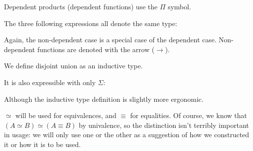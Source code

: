 \begin{definition}
  Dependent products (dependent functions) use the \(\Pi\) symbol.

  The three following expressions all denote the same type:

  \begin{multicols}{3}
    \begin{agdalisting}
    \end{agdalisting}

    \begin{agdalisting}
    \end{agdalisting}

    \begin{agdalisting}
    \end{agdalisting}
  \end{multicols}

  Again, the non-dependent case is a special case of the dependent case.
  Non-dependent functions are denoted with the arrow (\(\rightarrow\)).
\end{definition}

\begin{definition}
  We define disjoint union as an inductive type.

  \begin{agdalisting}
  \end{agdalisting}

  It is also expressible with only \(\Sigma\):

  \begin{agdalisting}
  \end{agdalisting}

  Although the inductive type definition is slightly more ergonomic.
\end{definition}
\begin{definition}
  \(\simeq\) will be used for equivalences, and \(\equiv\) for equalities.
  Of course, we know that \((A \simeq B) \simeq (A \equiv B)\) by univalence,
  so the distinction isn't terribly important in usage: we will only use one
  or the other as a suggestion of how we constructed it or how it is to be
  used.
\end{definition}

